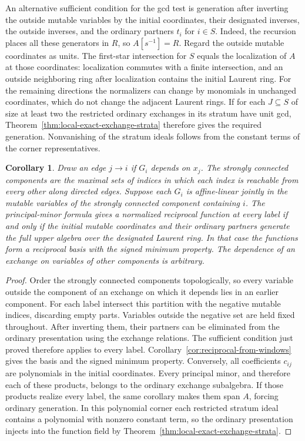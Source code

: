 \documentclass[11pt,reqno]{amsart}
\numberwithin{equation}{section}
\newtheorem{corollary}[theorem]{Corollary}
\theoremstyle{definition}
\theoremstyle{remark}
\begin{document}
An alternative sufficient condition for the gcd test is generation
after inverting the outside mutable variables by the initial
coordinates, their designated inverses, the outside inverses, and
the ordinary partners \(t_i\) for \(i\in S\). Indeed, the recursion
places all these generators in \(R\), so \(A[s^{-1}]=R\).
Regard the outside mutable coordinates as units. The first-star
intersection for \(S\) equals the localization of \(A\) at those
coordinates: localization commutes with a finite intersection, and
an outside neighboring ring after localization contains the initial
Laurent ring. For the remaining directions the normalizers can
change by monomials in unchanged coordinates, which do not change
the adjacent Laurent rings. If for each \(J\subseteq S\) of size
at least two the restricted ordinary exchanges in its stratum have
unit gcd, Theorem~\ref{thm:local-exact-exchange-strata} therefore
gives the required generation. Nonvanishing of the stratum ideals
follows from the constant terms of the corner representatives.

\begin{corollary}\label{cor:component-linear-reciprocity}
Draw an edge \(j\to i\) if \(G_i\) depends on \(x_j\). The
strongly connected components are the maximal sets of indices in
which each index is reachable from every other along directed edges. Suppose each
\(G_i\) is affine-linear jointly in the mutable variables of the
strongly connected component containing \(i\). The principal-minor
formula gives a normalized reciprocal function at every label if and
only if the initial mutable coordinates and their ordinary partners
generate the full upper algebra over the designated Laurent ring.
In that case the functions form a reciprocal basis with the signed
minimum property. The dependence of an exchange on variables of
other components is arbitrary.
\end{corollary}
\begin{proof}
Order the strongly connected components topologically, so every
variable outside the component of an exchange on which it depends
lies in an earlier component. For each label intersect this partition
with the negative mutable indices, discarding empty parts. Variables
outside the negative set are held fixed throughout. After inverting
them, their partners can be eliminated from the ordinary presentation
using the exchange relations. The sufficient condition just proved therefore applies to every
label. Corollary~\ref{cor:reciprocal-from-windows} gives the basis
and the signed minimum property. Conversely, all coefficients
\(c_{ij}\) are polynomials in the initial coordinates. Every
principal minor, and therefore each of these products, belongs to the
ordinary exchange subalgebra. If those products realize every label,
the same corollary makes them span \(A\), forcing ordinary
generation. In this polynomial corner each restricted stratum
ideal contains a polynomial with nonzero constant term, so the
ordinary presentation injects into the function field by
Theorem~\ref{thm:local-exact-exchange-strata}.
\end{proof}
\end{document}
